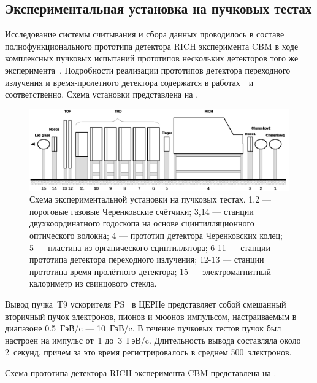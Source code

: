 \subsection{Экспериментальная установка на пучковых тестах}\label{section:secBeamtimeSetup}

Исследование системы считывания и сбора данных проводилось в составе полнофункционального прототипа детектора RICH эксперимента CBM в ходе комплексных пучковых испытаний прототипов нескольких детекторов того же эксперимента~\cite{BEAMTIME}. Подробности реализации прототипов детектора переходного излучения и время-пролетного детектора содержатся в работах~\cite{TRDBEAMTIME}~и~\cite{} соответственно. Схема установки представлена на .

\begin{figure}[H]
\includegraphics[width=1.0\textwidth]{pictures/9_Beamtime_setup_Full.eps}
\caption{Схема экспериментальной установки на пучковых тестах. 1,2 --- пороговые газовые Черенковские счётчики; 3,14 --- станции двухкоординатного годоскопа на основе сцинтилляционного оптического волокна; 4 --- прототип детектора Черенковских колец; 5 --- пластина из органического сцинтиллятора; 6-11 --- станции прототипа детектора переходного излучения; 12-13 --- станции прототипа время-пролётного детектора; 15 --- электромагнитный калориметр из свинцового стекла.}
\label{fig:Beamtime}
\end{figure}

Вывод пучка~T9 ускорителя PS~\cite{CERNPST9} в ЦЕРНе представляет собой смешанный вторичный пучок электронов, пионов и мюонов импульсом, настраиваемым в диапазоне 0.5~ГэВ/c --- 10~ГэВ/c. В течение пучковых тестов пучок был настроен на импульс от~1 до~3~ГэВ/c. Длительность вывода составляла около 2~секунд, причем за это время регистрировалось в среднем 500~электронов.

Схема прототипа детектора RICH эксперимента CBM представлена на .

